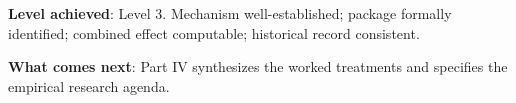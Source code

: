 \begin{summarybox}
\textbf{Level achieved}: Level 3. Mechanism well-established;
package formally identified; combined effect computable;
historical record consistent.

\textbf{What comes next}: Part IV synthesizes the worked
treatments and specifies the empirical research agenda.
\end{summarybox}

\cleardoublepage
